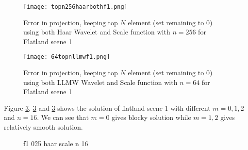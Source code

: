 \begin{figure}[tbh]
\centering{}
\captionsetup{justification=centering}
\texttt{[image: topn256haarbothf1.png]}
\caption{\label{fig:errorvstopnhaarwavelet}Error in projection,  keeping top $N$ element (set remaining to $0$) using both Haar Wavelet and Scale function with $n=256$ for  Flatland scene 1}
\end{figure}

\begin{figure}[tbh]
\centering{}
\captionsetup{justification=centering}
\texttt{[image: 64topnllmwf1.png]}
\caption{\label{fig:errorvstopnllmwwavelet}Error in projection,  keeping top $N$ element (set remaining to $0$) using both LLMW Wavelet and Scale function with $n=64$ for  Flatland scene 1}
\end{figure}

% 







Figure \ref{fig:f1_025_haar_scale_plot_n_16}, \ref{fig:f1_025_haar_scale_plot_n_16} and \ref{fig:f1_025_haar_scale_plot_n_16} shows the solution of flatland scene 1 with different $m=0,1,2$ and $n=16$.  We can see that $m=0$ gives blocky solution while $m=1,2$ gives relatively smooth solution.

\begin{figure}%
    \centering
    \qquad
    \caption{f1 025 haar scale n 16}%
    \label{fig:f1_025_haar_scale_plot_n_16}%
\end{figure}


